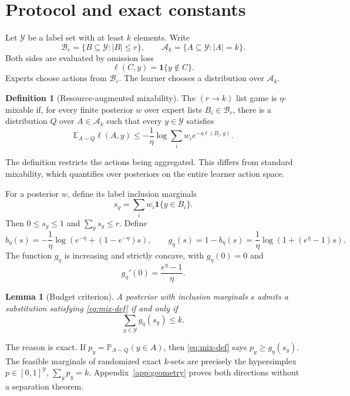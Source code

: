 \documentclass{article}
\newtheorem{lemma}[theorem]{Lemma}
\theoremstyle{definition}
\newtheorem{definition}[theorem]{Definition}
\theoremstyle{remark}
\newcommand{\E}{\mathbb E}
\newcommand{\Pp}{\mathbb P}
\newcommand{\cA}{\mathcal A}
\newcommand{\cY}{\mathcal Y}
\newcommand{\cB}{\mathcal B}
\newcommand{\1}{\mathbf 1}
\begin{document}
\section{Protocol and exact constants}
\label{sec:protocol}

Let \(\cY\) be a label set with at least \(k\) elements. Write \[ \cB_r=\{B\subseteq\cY:|B|\le r\}, \qquad \cA_k=\{A\subseteq\cY:|A|=k\}. \] Both sides are evaluated by omission loss \[ \ell(C,y)=\1\{y\notin C\}. \] Experts choose actions from \(\cB_r\). The learner chooses a distribution over \(\cA_k\).

\begin{definition}[Resource-augmented mixability]
\label{def:mix}
The \((r\!\to\!k)\) list game is \(\eta\)-mixable if, for every finite posterior \(w\) over expert lists \(B_i\in\cB_r\), there is a distribution \(Q\) over \(A\in\cA_k\) such that every \(y\in\cY\) satisfies
\begin{equation}
\label{eq:mix-def}
\E_{A\sim Q}\ell(A,y)
\le-\frac1\eta\log\sum_iw_i e^{-\eta\ell(B_i,y)}.
\end{equation}
\end{definition}

The definition restricts the actions being aggregated. This differs from standard mixability, which quantifies over posteriors on the entire learner action space.

For a posterior \(w\), define its label inclusion marginals \[ s_y=\sum_iw_i\1\{y\in B_i\}. \] Then \(0\le s_y\le1\) and \(\sum_ys_y\le r\). Define
\begin{equation}
\label{eq:bg}
b_\eta(s)=-\frac1\eta\log\left(e^{-\eta}+(1-e^{-\eta})s\right),
\qquad
g_\eta(s)=1-b_\eta(s)
=\frac1\eta\log\left(1+(e^\eta-1)s\right).
\end{equation}
The function \(g_\eta\) is increasing and strictly concave, with \(g_\eta(0)=0\) and \[ g_\eta'(0)=\frac{e^\eta-1}{\eta}. \]

\begin{lemma}[Budget criterion]
\label{lem:budget}
A posterior with inclusion marginals \(s\) admits a substitution satisfying \eqref{eq:mix-def} if and only if
\begin{equation}
\label{eq:budget}
\sum_{y\in\cY}g_\eta(s_y)\le k.
\end{equation}
\end{lemma}

The reason is exact. If \(p_y=\Pp_{A\sim Q}(y\in A)\), then \eqref{eq:mix-def} says \(p_y\ge g_\eta(s_y)\). The feasible marginals of randomized exact \(k\)-sets are precisely the hypersimplex \(p\in[0,1]^\cY\), \(\sum_yp_y=k\). Appendix~\ref{app:geometry} proves both directions without a separation theorem.
\end{document}
